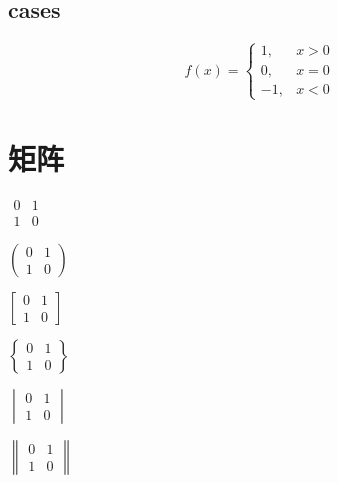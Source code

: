 \documentclass{article}
\begin{document}
	\subsection{cases}
	\begin{equation}
		f(x)=\begin{cases}
			1,&x>0 \\
			0,&x=0 \\
			-1,&x<0
		\end{cases}
	\end{equation}


  \section{矩阵}
	$\begin{matrix}
		0 & 1 \\
		1 & 0
	\end{matrix}$

	$\begin{pmatrix}
		0 & 1 \\
		1 & 0
	\end{pmatrix}$

	$\begin{bmatrix}
		0 & 1 \\
		1 & 0
	\end{bmatrix}$

	$\begin{Bmatrix}
	0 & 1 \\
	1 & 0
	\end{Bmatrix}$

	$\begin{vmatrix}
		0 & 1 \\
		1 & 0
	\end{vmatrix}$

	$\begin{Vmatrix}
	0 & 1 \\
	1 & 0
	\end{Vmatrix}$
\end{document}
